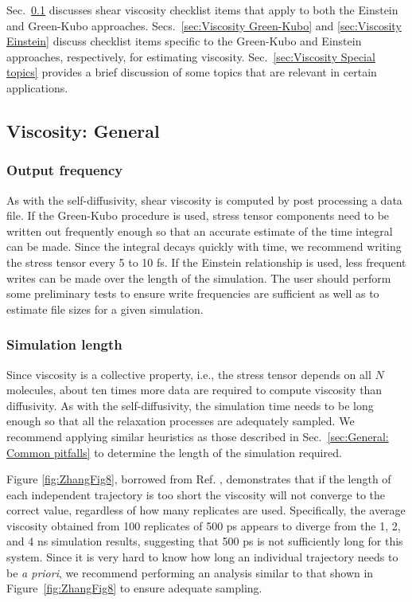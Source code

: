 \documentclass[9pt,bestpractices]{livecoms}
\begin{document}
Sec.\ \ref{sec:Viscosity General} discusses shear viscosity checklist items that apply to both the Einstein and Green-Kubo approaches. Secs.\ \ref{sec:Viscosity Green-Kubo} and \ref{sec:Viscosity Einstein} discuss checklist items specific to the Green-Kubo and Einstein approaches, respectively, for estimating viscosity. Sec.\ \ref{sec:Viscosity Special topics} provides a brief discussion of some topics that are relevant in certain applications.


\subsection{Viscosity: General} \label{sec:Viscosity General}

\subsubsection{Output frequency} \label{sec:Viscosity:General: Output frequency}

As with the self-diffusivity, shear viscosity is computed by post processing a data file. If the Green-Kubo procedure is used, stress tensor components need to be written out frequently enough so that an accurate estimate of the time integral can be made. Since the integral decays quickly with time, we recommend writing the stress tensor every 5 to 10 fs. If the Einstein relationship is used, less frequent writes can be made over the length of the simulation. The user should perform some preliminary tests to ensure write frequencies are sufficient as well as to estimate file sizes for a given simulation.

\subsubsection{Simulation length} \label{sec:Viscosity:General: Simulation length}

Since viscosity is a collective property, i.e., the stress tensor depends on all $N$ molecules, about ten times more data are required to compute viscosity than diffusivity. As with the self-diffusivity, the simulation time needs to be long enough so that all the relaxation processes are adequately sampled. We recommend applying similar heuristics as those described in Sec.\ \ref{sec:General: Common pitfalls} to determine the length of the simulation required.

Figure \ref{fig:ZhangFig8}, borrowed from Ref. \cite{Zhang2015}, demonstrates that if the length of each independent trajectory is too short the viscosity will not converge to the correct value, regardless of how many replicates are used. Specifically, the average viscosity obtained from 100 replicates of 500 ps appears to diverge from the 1, 2, and 4 ns simulation results, suggesting that 500 ps is not sufficiently long for this system. Since it is very hard to know how long an individual trajectory needs to be \textit{a priori}, we recommend performing an analysis similar to that shown in Figure~\ref{fig:ZhangFig8} to ensure adequate sampling.
\end{document}
